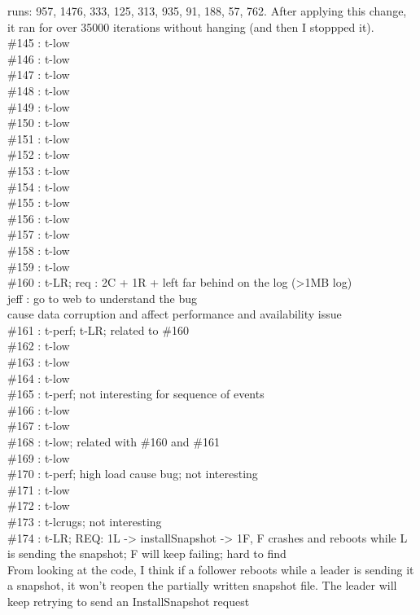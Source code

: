 runs: 957, 1476, 333, 125, 313, 935, 91, 188, 57, 762. After applying
this change, it ran for over 35000 iterations without hanging (and then
I stoppped it).\\
\#145 : t-low\\
\#146 : t-low\\
\#147 : t-low\\
\#148 : t-low\\
\#149 : t-low\\
\#150 : t-low\\
\#151 : t-low\\
\#152 : t-low\\
\#153 : t-low\\
\#154 : t-low\\
\#155 : t-low\\
\#156 : t-low\\
\#157 : t-low\\
\#158 : t-low\\
\#159 : t-low\\
\#160 : t-LR; req : 2C + 1R + left far behind on the log (>1MB log)\\
jeff : go to web to understand the bug\\
cause data corruption and affect performance and availability issue\\
\#161 : t-perf; t-LR; related to \#160\\
\#162 : t-low\\
\#163 : t-low\\
\#164 : t-low\\
\#165 : t-perf; not interesting for sequence of events\\
\#166 : t-low\\
\#167 : t-low\\
\#168 : t-low; related with \#160 and \#161\\
\#169 : t-low\\
\#170 : t-perf; high load cause bug; not interesting\\
\#171 : t-low\\
\#172 : t-low\\
\#173 : t-lcrugs; not interesting\\
\#174 : t-LR; REQ: 1L -> installSnapshot -> 1F,
F crashes and reboots while L is sending the snapshot; F will keep failing;
hard to find\\
From looking at the code, I think if a follower reboots while a leader 
is sending it a snapshot, it won't reopen the partially written snapshot 
file. The leader will keep retrying to send an InstallSnapshot request 
